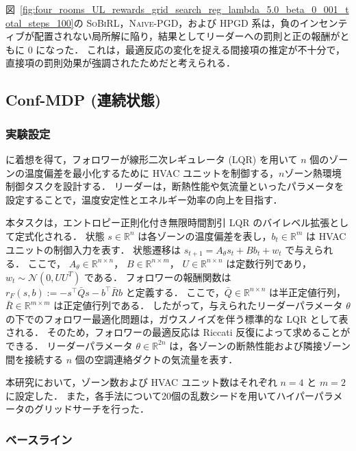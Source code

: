 \documentclass[originalpaper,fleqn]{jsaiart}     %
\providecommand{\R}{\mathbb{R}} %
\begin{document}
図~\ref{fig:four_rooms_UL_rewards_grid_search_reg_lambda_5.0_beta_0_001_total_steps_100}の \textsc{SoBiRL}，\textsc{Naive-PGD}，および \textsc{HPGD} 系は，負のインセンティブが配置されない局所解に陥り，結果としてリーダーへの罰則と正の報酬がともに 0 になった．
これは，最適反応の変化を捉える間接項の推定が不十分で，直接項の罰則効果が強調されたためだと考えられる．

\subsection{Conf-MDP (連続状態)}\label{sec:experiment_Conf-MDP_continuous}

\subsubsection{実験設定}

\cite{AFRAM2014343}に着想を得て，フォロワーが線形二次レギュレータ (LQR) を用いて $n$ 個のゾーンの温度偏差を最小化するために HVAC ユニットを制御する，$n$ゾーン熱環境制御タスクを設計する．
リーダーは，断熱性能や気流量といったパラメータを設定することで，温度安定性とエネルギー効率の向上を目指す．

本タスクは，エントロピー正則化付き無限時間割引 LQR のバイレベル拡張として定式化される．
状態 $s\in\R^n$ は各ゾーンの温度偏差を表し，$b_t\in\R^m$ は HVAC ユニットの制御入力を表す．
状態遷移は
$s_{t+1} = A_{\theta} s_{t} + B b_{t} + w_{t}$
で与えられる．
ここで，
$A_{\theta}\in\R^{n\times n}$，
$B\in\R^{n\times m}$，
$U\in\R^{n\times n}$
は定数行列であり，
$w_t\sim \mathcal{N}(0,UU^T)$
である．
フォロワーの報酬関数は $r_F(s, b) := - s^{\top} \bar{Q} s - b^{\top} \bar{R} b$ と定義する．
ここで，$\bar{Q} \in \R^{n\times n}$ は半正定値行列，$\bar{R} \in \R^{m\times m}$ は正定値行列である．
したがって，与えられたリーダーパラメータ $\theta$ の下でのフォロワー最適化問題は，ガウスノイズを伴う標準的な LQR として表される．
そのため，フォロワーの最適反応は Riccati 反復によって求めることができる．
リーダーパラメータ $\theta\in\R^{2n}$ は，各ゾーンの断熱性能および隣接ゾーン間を接続する $n$ 個の空調連絡ダクトの気流量を表す．

本研究において，ゾーン数および HVAC ユニット数はそれぞれ $n=4$ と $m=2$ に設定した．
また，各手法について20個の乱数シードを用いてハイパーパラメータのグリッドサーチを行った．

\subsubsection{ベースライン}
\end{document}
